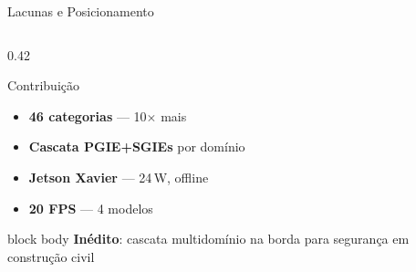 \begin{frame}{Lacunas e Posicionamento}
\begin{columns}[T]
\begin{column}{0.42\textwidth}
      {
      \begin{block}{\centering\scriptsize Contribui\c{c}\~{a}o}
        \begin{itemize}\scriptsize
          \setlength{\itemsep}{0pt}
          \item[\color{headcolor}$\checkmark$] \textbf{46 categorias} --- 10$\times$ mais
          \item[\color{headcolor}$\checkmark$] \textbf{Cascata PGIE+SGIEs} por dom\'{i}nio
          \item[\color{headcolor}$\checkmark$] \textbf{Jetson Xavier} --- 24\,W, offline
          \item[\color{headcolor}$\checkmark$] \textbf{20 FPS} --- 4 modelos
        \end{itemize}
      \end{block}
      }

      \vspace{2mm}

      \begin{beamercolorbox}[wd=\textwidth, rounded=true, shadow=false]{block body}
        \centering
        {\scriptsize\color{stagecolor}%
          \textbf{In\'{e}dito}: cascata multidom\'{i}nio na borda para seguran\c{c}a em constru\c{c}\~{a}o civil}
      \end{beamercolorbox}
    \end{column}
  \end{columns}
  \vfill
\end{frame}
